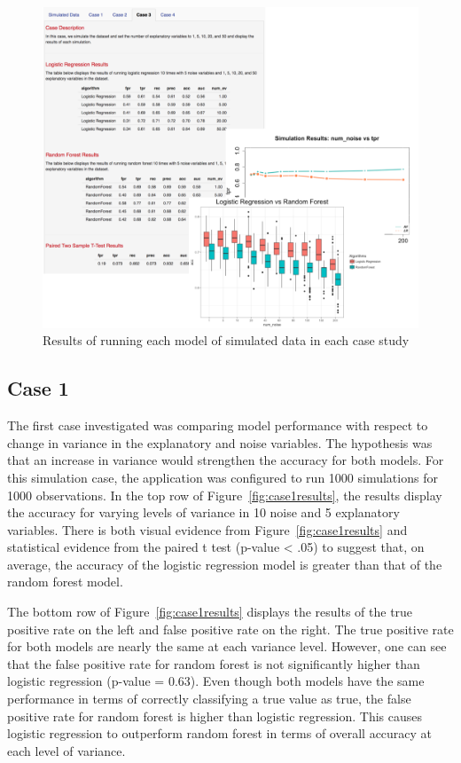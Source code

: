 \documentclass{llncs}
\begin{document}
\begin{figure}
\centering
\includegraphics[scale=0.75]{center-content.png}
\caption{Results of running each model of simulated data in each case study}
\label{fig:center-content}
\end{figure}

\subsection{Case 1}

The first case investigated was comparing model performance with respect to change in variance in the explanatory and noise variables. The hypothesis was that an increase in variance would strengthen the accuracy for both models. For this simulation case, the application was configured to run 1000 simulations for 1000 observations. In the top row of Figure~\ref{fig:case1results}, the results display the accuracy for varying levels of variance in 10 noise and 5 explanatory variables. There is both visual evidence from Figure~\ref{fig:case1results} and statistical evidence  from the paired t test (p-value < .05) to suggest that, on average, the accuracy of the logistic regression model is  greater than that of the random forest model. 

The bottom row of Figure~\ref{fig:case1results} displays the results of the true positive rate on the left and false positive rate on the right. The true positive rate for both models are nearly the same at each variance level.  However, one can see that the false positive rate for random forest is not significantly higher than logistic regression (p-value = 0.63).  Even though both models have the same performance in terms of correctly classifying a true value as true, the false positive rate for random forest is higher than logistic regression.  This causes logistic regression to outperform random forest in terms of overall accuracy at each level of variance.
\end{document}
